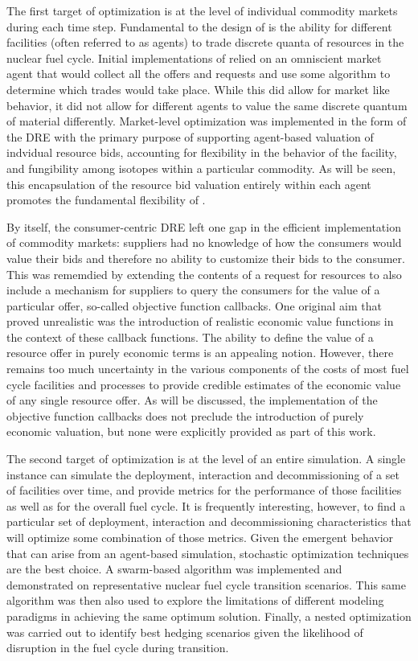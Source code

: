 The first target of optimization is at the level of individual commodity
markets during each time step.  Fundamental to the design of \Cyclus is the
ability for different facilities (often referred to as agents) to trade
discrete quanta of resources in the nuclear fuel cycle.  Initial
implementations of \Cyclus relied on an omniscient market agent that would
collect all the offers and requests and use some algorithm to determine which
trades would take place.  While this did allow for market like behavior, it
did not allow for different agents to value the same discrete quantum of
material differently.  Market-level optimization was implemented in the form
of the \gls{DRE} with the primary purpose of supporting agent-based valuation
of indvidual resource bids, accounting for flexibility in the behavior of the
facility, and fungibility among isotopes within a particular commodity.  As
will be seen, this encapsulation of the resource bid valuation entirely within
each agent promotes the fundamental flexibility of \Cyclus.

By itself, the consumer-centric \gls{DRE} left one gap in the efficient
implementation of commodity markets: suppliers had no knowledge of how the
consumers would value their bids and therefore no ability to customize their
bids to the consumer.  This was rememdied by extending the contents of a
request for resources to also include a mechanism for suppliers to query the
consumers for the value of a particular offer, so-called objective function
callbacks.  One original aim that proved unrealistic was the introduction of
realistic economic value functions in the context of these callback functions.
The ability to define the value of a resource offer in purely economic terms
is an appealing notion.  However, there remains too much uncertainty in the
various components of the costs of most fuel cycle facilities and processes to
provide credible estimates of the economic value of any single resource offer.
As will be discussed, the implementation of the objective function callbacks
does not preclude the introduction of purely economic valuation, but none were
explicitly provided as part of this work.

The second target of optimization is at the level of an entire simulation.  A
single \Cyclus instance can simulate the deployment, interaction and
decommissioning of a set of facilities over time, and provide metrics for the
performance of those facilities as well as for the overall fuel cycle.  It is
frequently interesting, however, to find a particular set of deployment,
interaction and decommissioning characteristics that will optimize some
combination of those metrics.  Given the emergent behavior that can arise from
an agent-based simulation, stochastic optimization techniques are the best
choice.  A swarm-based algorithm was implemented and demonstrated on
representative nuclear fuel cycle transition scenarios.  This same algorithm
was then also used to explore the limitations of different modeling paradigms
in achieving the same optimum solution.  Finally, a nested
optimization was carried out to identify best hedging scenarios given the
likelihood of disruption in the fuel cycle during transition.

